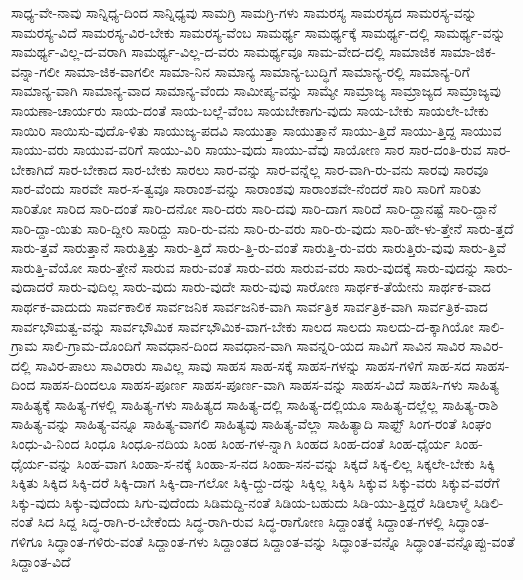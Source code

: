 {ಸಾಧ್ಯ-ವೇ-ನಾವು
ಸಾನ್ನಿಧ್ಯ-ದಿಂದ
ಸಾನ್ನಿಧ್ಯವು
ಸಾಮಗ್ರಿ
ಸಾಮಗ್ರಿ-ಗಳು
ಸಾಮರಸ್ಯ
ಸಾಮರಸ್ಯದ
ಸಾಮರಸ್ಯ-ವನ್ನು
ಸಾಮರಸ್ಯ-ವಿದೆ
ಸಾಮರಸ್ಯ-ವಿರ-ಬೇಕು
ಸಾಮರಸ್ಯ-ವೆಂಬ
ಸಾಮರ್ಥ್ಯ
ಸಾಮರ್ಥ್ಯಕ್ಕೆ
ಸಾಮರ್ಥ್ಯ-ದಲ್ಲಿ
ಸಾಮರ್ಥ್ಯ-ವನ್ನು
ಸಾಮರ್ಥ್ಯ-ವಿಲ್ಲ-ದ-ವರಾಗಿ
ಸಾಮರ್ಥ್ಯ-ವಿಲ್ಲ-ದ-ವರು
ಸಾಮರ್ಥ್ಯವೂ
ಸಾಮ-ವೇದ-ದಲ್ಲಿ
ಸಾಮಾಜಿಕ
ಸಾಮಾ-ಜಿಕ-ವನ್ನಾ-ಗಲೀ
ಸಾಮಾ-ಜಿಕ-ವಾಗಲೀ
ಸಾಮಾ-ನಿನ
ಸಾಮಾನ್ಯ
ಸಾಮಾನ್ಯ-ಬುದ್ಧಿಗೆ
ಸಾಮಾನ್ಯ-ರಲ್ಲಿ
ಸಾಮಾನ್ಯ-ರಿಗೆ
ಸಾಮಾನ್ಯ-ವಾಗಿ
ಸಾಮಾನ್ಯ-ವಾದ
ಸಾಮಾನ್ಯ-ವೆಂದು
ಸಾಮೀಪ್ಯ-ವನ್ನು
ಸಾಮ್ಯೇ
ಸಾಮ್ರಾಜ್ಯ
ಸಾಮ್ರಾಜ್ಯದ
ಸಾಮ್ರಾಜ್ಯವು
ಸಾಯಣಾ-ಚಾರ್ಯರು
ಸಾಯ-ದಂತೆ
ಸಾಯ-ಬಲ್ಲೆ-ವೆಂಬ
ಸಾಯಬೇಕಾಗು-ವುದು
ಸಾಯ-ಬೇಕು
ಸಾಯಲೇ-ಬೇಕು
ಸಾಯಿರಿ
ಸಾಯಿಸು-ವುದೊ-ಳಿತು
ಸಾಯುಜ್ಯ-ಪದವಿ
ಸಾಯುತ್ತಾ
ಸಾಯುತ್ತಾನೆ
ಸಾಯು-ತ್ತಿದೆ
ಸಾಯು-ತ್ತಿದ್ದ
ಸಾಯುವ
ಸಾಯು-ವರು
ಸಾಯುವ-ವರಿಗೆ
ಸಾಯು-ವಿರಿ
ಸಾಯು-ವುದು
ಸಾಯು-ವೆವು
ಸಾಯೋಣ
ಸಾರ
ಸಾರ-ದಂತಿ-ರುವ
ಸಾರ-ಬೇಕಾಗಿದೆ
ಸಾರ-ಬೇಕಾದ
ಸಾರ-ಬೇಕು
ಸಾರಲು
ಸಾರ-ವನ್ನು
ಸಾರ-ವನ್ನೆಲ್ಲ
ಸಾರ-ವಾಗಿ-ರು-ವನು
ಸಾರವು
ಸಾರವೂ
ಸಾರ-ವೆಂದು
ಸಾರವೇ
ಸಾರ-ಸ-ತ್ವವೂ
ಸಾರಾಂಶ-ವನ್ನು
ಸಾರಾಂಶವು
ಸಾರಾಂಶವೇ-ನೆಂದರೆ
ಸಾರಿ
ಸಾರಿಗೆ
ಸಾರಿತು
ಸಾರಿತೋ
ಸಾರಿದ
ಸಾರಿ-ದಂತೆ
ಸಾರಿ-ದನೋ
ಸಾರಿ-ದರು
ಸಾರಿ-ದವು
ಸಾರಿ-ದಾಗ
ಸಾರಿದೆ
ಸಾರಿ-ದ್ದಾನಷ್ಟೆ
ಸಾರಿ-ದ್ದಾನೆ
ಸಾರಿ-ದ್ದಾ-ಯಿತು
ಸಾರಿ-ದ್ದೀರಿ
ಸಾರಿದ್ದು
ಸಾರಿ-ರು-ವನು
ಸಾರಿ-ರು-ವರು
ಸಾರಿ-ರು-ವುದು
ಸಾರಿ-ಹೇ-ಳು-ತ್ತೇನೆ
ಸಾರು-ತ್ತದೆ
ಸಾರು-ತ್ತವೆ
ಸಾರುತ್ತಾನೆ
ಸಾರುತ್ತಿತ್ತು
ಸಾರು-ತ್ತಿದೆ
ಸಾರು-ತ್ತಿ-ರು-ವಂತೆ
ಸಾರುತ್ತಿ-ರು-ವರು
ಸಾರುತ್ತಿರು-ವುವು
ಸಾರು-ತ್ತಿವೆ
ಸಾರುತ್ತಿ-ವೆಯೋ
ಸಾರು-ತ್ತೇನೆ
ಸಾರುವ
ಸಾರು-ವಂತೆ
ಸಾರು-ವರು
ಸಾರುವ-ವರು
ಸಾರು-ವುದಕ್ಕೆ
ಸಾರು-ವುದನ್ನು
ಸಾರು-ವುದಾದರೆ
ಸಾರು-ವುದಿಲ್ಲ
ಸಾರು-ವುದು
ಸಾರು-ವುದೇ
ಸಾರು-ವುವು
ಸಾರೋಣ
ಸಾರ್ಥಕ-ತೆಯೇನು
ಸಾರ್ಥಕ-ವಾದ
ಸಾರ್ಥಕ-ವಾದುದು
ಸಾರ್ವಕಾಲಿಕ
ಸಾರ್ವಜನಿಕ
ಸಾರ್ವಜನಿಕ-ವಾಗಿ
ಸಾರ್ವತ್ರಿಕ
ಸಾರ್ವತ್ರಿಕ-ವಾಗಿ
ಸಾರ್ವತ್ರಿಕ-ವಾದ
ಸಾರ್ವಭೌಮತ್ವ-ವನ್ನು
ಸಾರ್ವಭೌಮಿಕ
ಸಾರ್ವಭೌಮಿಕ-ವಾಗ-ಬೇಕು
ಸಾಲದ
ಸಾಲದು
ಸಾಲದು-ದ-ಕ್ಕಾಗಿಯೋ
ಸಾಲಿ-ಗ್ರಾಮ
ಸಾಲಿ-ಗ್ರಾಮ-ದೊಂದಿಗೆ
ಸಾವಧಾನ-ದಿಂದ
ಸಾವಧಾನ-ವಾಗಿ
ಸಾವನ್ನರಿ-ಯದ
ಸಾವಿಗೆ
ಸಾವಿನ
ಸಾವಿರ
ಸಾವಿರ-ದಲ್ಲಿ
ಸಾವಿರ-ಪಾಲು
ಸಾವಿರಾರು
ಸಾವಿಲ್ಲ
ಸಾವು
ಸಾಹಸ
ಸಾಹ-ಸಕ್ಕೆ
ಸಾಹಸ-ಗಳನ್ನು
ಸಾಹಸ-ಗಳಿಗೆ
ಸಾಹ-ಸದ
ಸಾಹಸ-ದಿಂದ
ಸಾಹಸ-ದಿಂದಲೂ
ಸಾಹಸ-ಪೂರ್ಣ
ಸಾಹಸ-ಪೂರ್ಣ-ವಾಗಿ
ಸಾಹಸ-ವನ್ನು
ಸಾಹಸ-ವಿದೆ
ಸಾಹಸಿ-ಗಳು
ಸಾಹಿತ್ಯ
ಸಾಹಿತ್ಯಕ್ಕೆ
ಸಾಹಿತ್ಯ-ಗಳಲ್ಲಿ
ಸಾಹಿತ್ಯ-ಗಳು
ಸಾಹಿತ್ಯದ
ಸಾಹಿತ್ಯ-ದಲ್ಲಿ
ಸಾಹಿತ್ಯ-ದಲ್ಲಿಯೂ
ಸಾಹಿತ್ಯ-ದಲ್ಲೆಲ್ಲ
ಸಾಹಿತ್ಯ-ರಾಶಿ
ಸಾಹಿತ್ಯ-ವನ್ನು
ಸಾಹಿತ್ಯ-ವನ್ನೂ
ಸಾಹಿತ್ಯ-ವಾಗಲಿ
ಸಾಹಿತ್ಯವು
ಸಾಹಿತ್ಯ-ವೆಲ್ಲಾ
ಸಾಹಿತ್ಯಾದಿ
ಸಾಫ್ಟ್
ಸಿಂಗ-ರಂತೆ
ಸಿಂಘಂ
ಸಿಂಧು-ವಿ-ನಿಂದ
ಸಿಂಧೂ
ಸಿಂಧೂ-ನದಿಯ
ಸಿಂಹ
ಸಿಂಹ-ಗಳ-ನ್ನಾಗಿ
ಸಿಂಹದ
ಸಿಂಹ-ದಂತೆ
ಸಿಂಹ-ಧೈರ್ಯ
ಸಿಂಹ-ಧೈರ್ಯ-ವನ್ನು
ಸಿಂಹ-ವಾಗ
ಸಿಂಹಾ-ಸ-ನಕ್ಕೆ
ಸಿಂಹಾ-ಸ-ನದ
ಸಿಂಹಾ-ಸನ-ವನ್ನು
ಸಿಕ್ಕದೆ
ಸಿಕ್ಕ-ಲಿಲ್ಲ
ಸಿಕ್ಕಲೇ-ಬೇಕು
ಸಿಕ್ಕಿ
ಸಿಕ್ಕಿತು
ಸಿಕ್ಕಿದ
ಸಿಕ್ಕಿ-ದರೆ
ಸಿಕ್ಕಿ-ದಾಗ
ಸಿಕ್ಕಿ-ದಾ-ಗಲೋ
ಸಿಕ್ಕಿ-ದ್ದು-ದನ್ನು
ಸಿಕ್ಕಿಲ್ಲ
ಸಿಕ್ಕಿಸಿ
ಸಿಕ್ಕುವ
ಸಿಕ್ಕು-ವರು
ಸಿಕ್ಕುವ-ವರೆಗೆ
ಸಿಕ್ಕು-ವುದು
ಸಿಕ್ಕು-ವುದೆಂದು
ಸಿಗು-ವುದೆಂದು
ಸಿಡಿಮದ್ದಿ-ನಂತೆ
ಸಿಡಿಯ-ಬಹುದು
ಸಿಡಿ-ಯು-ತ್ತಿದ್ದರೆ
ಸಿಡಿಲಾಳ್ಮೆ
ಸಿಡಿಲಿ-ನಂತೆ
ಸಿದ
ಸಿದ್ದ
ಸಿದ್ಧ-ರಾಗಿ-ರ-ಬೇಕೆಂದು
ಸಿದ್ಧ-ರಾಗಿ-ರುವ
ಸಿದ್ಧ-ರಾಗೋಣ
ಸಿದ್ದಾಂತಕ್ಕೆ
ಸಿದ್ದಾಂತ-ಗಳಲ್ಲಿ
ಸಿದ್ಧಾಂತ-ಗಳಿಗೂ
ಸಿದ್ಧಾಂತ-ಗಳಿರು-ವಂತೆ
ಸಿದ್ದಾಂತ-ಗಳು
ಸಿದ್ದಾಂತದ
ಸಿದ್ದಾಂತ-ವನ್ನು
ಸಿದ್ಧಾಂತ-ವನ್ನೊ
ಸಿದ್ಧಾಂತ-ವನ್ನೊಪ್ಪು-ವಂತೆ
ಸಿದ್ದಾಂತ-ವಿದೆ
}
